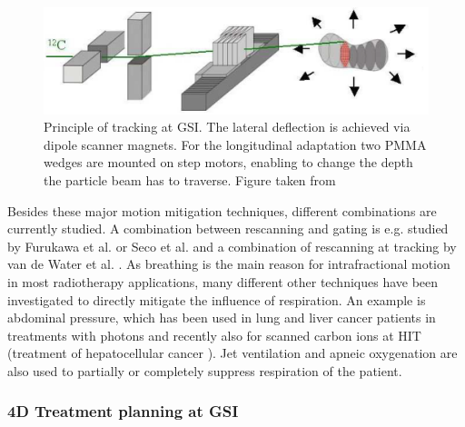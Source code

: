 \begin{figure}[H]
\begin{center}
\includegraphics[scale=0.4]{./teile/introduction/tracking.png}
\caption{Principle of tracking at GSI. The lateral deflection is achieved via dipole scanner magnets. For the longitudinal adaptation two 
PMMA wedges are mounted on step motors, enabling to change the depth the particle beam has to traverse. Figure taken from \cite{Gro04}}
\label{tracking}
\end{center}
\end{figure}

Besides these major motion mitigation techniques, different combinations are currently studied. A combination between rescanning and 
gating is e.g. studied by Furukawa et al. \cite{Fur07} or Seco et al. \cite{Sec09} and a combination of rescanning at tracking 
by van de Water et al. \cite{Wat09}.\newline
\newline
As breathing is the main reason for intrafractional motion in most radiotherapy applications, many different other techniques have been 
investigated to directly mitigate the influence of respiration. An example is abdominal pressure, which has been used in lung 
and liver cancer patients in treatments with photons \cite{Neg01, Hof03} and recently also for scanned carbon ions at HIT (treatment 
of hepatocellular cancer \cite{Com11}). Jet ventilation \cite{Hof03} and apneic oxygenation \cite{RPTC12} are also used to partially or 
completely suppress respiration of the patient. 


\subsubsection{4D Treatment planning at GSI}

